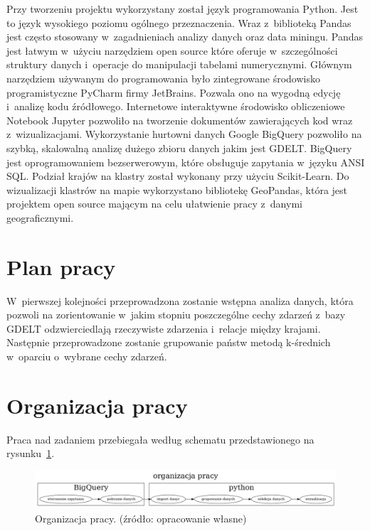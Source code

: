 \documentclass[11pt]{report}
\begin{document}
    Przy tworzeniu projektu wykorzystany został język programowania Python.
    Jest to język wysokiego poziomu ogólnego przeznaczenia.
    Wraz z~biblioteką Pandas jest często stosowany w~zagadnieniach analizy danych oraz data miningu.
    Pandas jest łatwym w~użyciu narzędziem open source które oferuje w~szczególności struktury danych i~operacje do manipulacji tabelami numerycznymi.
    Głównym narzędziem używanym do programowania było zintegrowane środowisko programistyczne PyCharm firmy JetBrains.
    Pozwala ono na wygodną edycję i~analizę kodu źródłowego.
    Internetowe interaktywne środowisko obliczeniowe Notebook Jupyter pozwoliło na tworzenie dokumentów zawierających kod wraz z~wizualizacjami.
    Wykorzystanie hurtowni danych Google BigQuery pozwoliło na szybką, skalowalną analizę dużego zbioru danych jakim jest GDELT.
    BigQuery jest oprogramowaniem bezserwerowym, które obsługuje zapytania w~języku ANSI SQL.
    Podział krajów na klastry został wykonany przy użyciu Scikit-Learn.
    Do wizualizacji klastrów na mapie wykorzystano bibliotekę GeoPandas, która jest projektem open source mającym na celu ułatwienie pracy z~danymi geograficznymi.


    \section{Plan pracy}\label{sec:plan-pracy}

    W~pierwszej kolejności przeprowadzona zostanie wstępna analiza danych, która pozwoli na zorientowanie w~jakim stopniu poszczególne cechy zdarzeń z~bazy GDELT odzwierciedlają rzeczywiste zdarzenia i~relacje między krajami.
    Następnie przeprowadzone zostanie grupowanie państw metodą k-średnich w~oparciu o~wybrane cechy zdarzeń.


    \section{Organizacja pracy}\label{sec:organizacja-pracy}
    Praca nad zadaniem przebiegała według schematu przedstawionego na rysunku~\ref{fig:organizacjia}.

    \begin{figure}[!htp]
        \centering
        \includegraphics[width=\linewidth]{fig/organizacja.png}
        \caption{Organizacja pracy. (źródło: opracowanie własne)}
        \label{fig:organizacjia}
    \end{figure}
\end{document}
